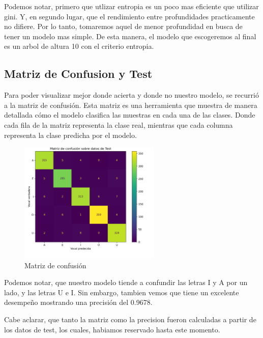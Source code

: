 \documentclass[10pt,a4paper]{article}
\begin{document}
Podemos notar, primero que utlizar entropia es un poco mas eficiente que utilizar gini. Y, en segundo lugar, que el rendimiento entre profundidades practicamente no difiere. Por lo tanto, tomaremos aquel de menor profundidad en busca de tener un modelo mas simple. De esta manera, el modelo que escogeremos al final es un arbol de altura 10 con el criterio entropia. \vspace{0.05cm}

\newpage

\subsection{Matriz de Confusion y Test}

Para poder visualizar mejor donde acierta y donde no nuestro modelo, se recurrió a la matriz de confusión. Esta matriz es una herramienta que muestra de manera detallada cómo el modelo clasifica las muestras en cada una de las clases. Donde cada fila de la matriz representa la clase real, mientras que cada columna representa la clase predicha por el modelo.

\begin{figure}[ht]
  \centering
  \includegraphics[width=0.6\textwidth]{Imagenes/matriz_confusion_arbol.png}
  \caption{Matriz de confusión}
  \label{fig:Tabla 1}
\end{figure}

Podemos notar, que nuestro modelo tiende a confundir las letras I y A por un lado, y las letras U e I. Sin embargo, tambien vemos que tiene un excelente desempeño mostrando una precisión del 0.9678.

Cabe aclarar, que tanto la matriz como la precision fueron calculadas a partir de los datos de test, los cuales, habiamos reservado hasta este momento.
\end{document}

